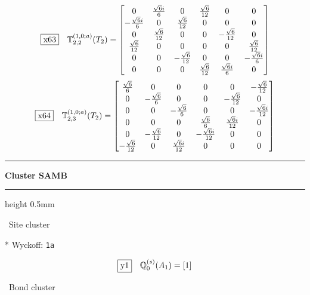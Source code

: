 \documentclass[fleqn,10pt,landscape]{jsarticle}
\begin{document}
\begin{dmath*}
\fbox{x63}\quad \mathbb{T}_{2,2}^{(1,0;a)}(T_{2})=\begin{bmatrix} 0 & \frac{\sqrt{6} i}{6} & 0 & \frac{\sqrt{6}}{12} & 0 & 0 \\ - \frac{\sqrt{6} i}{6} & 0 & \frac{\sqrt{6}}{12} & 0 & 0 & 0 \\ 0 & \frac{\sqrt{6}}{12} & 0 & 0 & - \frac{\sqrt{6}}{12} & 0 \\ \frac{\sqrt{6}}{12} & 0 & 0 & 0 & 0 & \frac{\sqrt{6}}{12} \\ 0 & 0 & - \frac{\sqrt{6}}{12} & 0 & 0 & - \frac{\sqrt{6} i}{6} \\ 0 & 0 & 0 & \frac{\sqrt{6}}{12} & \frac{\sqrt{6} i}{6} & 0 \end{bmatrix}
\end{dmath*}
\begin{dmath*}
\fbox{x64}\quad \mathbb{T}_{2,3}^{(1,0;a)}(T_{2})=\begin{bmatrix} \frac{\sqrt{6}}{6} & 0 & 0 & 0 & 0 & - \frac{\sqrt{6}}{12} \\ 0 & - \frac{\sqrt{6}}{6} & 0 & 0 & - \frac{\sqrt{6}}{12} & 0 \\ 0 & 0 & - \frac{\sqrt{6}}{6} & 0 & 0 & - \frac{\sqrt{6} i}{12} \\ 0 & 0 & 0 & \frac{\sqrt{6}}{6} & \frac{\sqrt{6} i}{12} & 0 \\ 0 & - \frac{\sqrt{6}}{12} & 0 & - \frac{\sqrt{6} i}{12} & 0 & 0 \\ - \frac{\sqrt{6}}{12} & 0 & \frac{\sqrt{6} i}{12} & 0 & 0 & 0 \end{bmatrix}
\end{dmath*}
\vspace{5mm}
\noindent \rule[0.5mm]{5mm}{0.5mm}\hspace{3mm}\textbf{Cluster SAMB}\hspace{3mm}\leaders\hrule height 0.5mm\hfill\kern0pt
\vspace{3mm}

\noindent\textbullet\, Site cluster

\vspace{5mm}

\noindent ** Wyckoff: \texttt{1a}

\begin{dmath*}
\fbox{y1}\quad \mathbb{Q}_{0}^{(s)}(A_{1})=\left[ 1 \right]
\end{dmath*}
\vspace{5mm}

\noindent\textbullet\, Bond cluster
\end{document}
